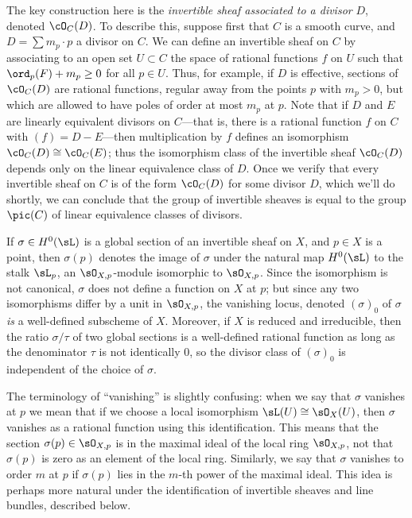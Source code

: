 The key construction here is the \emph{invertible sheaf associated to a divisor} $D$, denoted $\cO_C(D)$. To describe this, suppose first that $C$ is a smooth curve, and $D = \sum m_p\cdot p$ a divisor on $C$. We can define an invertible sheaf on $C$ by associating to an open set $U \subset C$ the space of rational functions $f$ on $U$ such that $\ord_p(F) + m_p \geq 0$ for all $p \in U$. Thus, for example, if $D$ is effective, sections of $\cO_C(D)$ are rational functions, regular away from the points $p$ with $m_p > 0$, but which are allowed to have poles of order at most $m_p$ at $p$. Note that if $D$ and $E$ are linearly equivalent divisors on $C$---that is, there is a rational function $f$ on $C$ with $(f) = D - E$---then multiplication by $f$ defines an isomorphism $\cO_C(D) \cong \cO_C(E)$; thus the isomorphism class of the invertible sheaf $\cO_C(D)$ depends only on the linear equivalence class of $D$. Once we verify that every invertible sheaf on $C$ is of the form $\cO_C(D)$ for some divisor $D$, which we'll do shortly, we can conclude that the group of invertible sheaves is equal to the group $\pic(C)$ of linear equivalence classes of divisors. 

If $\sigma \in H^0(\sL)$ is a global section of an invertible sheaf
on $X$, and $p\in X$ is a point, then $\sigma(p)$ denotes the image of $\sigma$ under the natural map $H^0(\sL)$ to the stalk $\sL_{p}$, an $\sO_{X,p}$-module isomorphic to $\sO_{X,p}$. Since the isomorphism is not canonical, $\sigma$ does not define a function on $X$ at $p$; but since any two isomorphisms
differ by a unit in $\sO_{X,p}$, the vanishing locus, denoted $(\sigma)_0$ of $\sigma$ \emph{is} a well-defined subscheme of $X$. Moreover, if $X$ is reduced and irreducible, then the ratio $\sigma/\tau$ of two global sections is a well-defined rational function as long as the denominator $\tau$ is not identically 0, so the divisor class of 
$(\sigma)_0$ is independent of the choice of $\sigma$.

The terminology of ``vanishing'' is slightly confusing: when we  say that $\sigma$ vanishes at $p$ we mean
that if we choose a local isomorphism $\sL(U) \cong \sO_X(U)$, then $\sigma$ vanishes as a rational function using this
identification. This means that the section $\sigma(p)\in \sO_{X,p}$ is in the maximal ideal of the local ring $ \sO_{X,p}$, not that $\sigma(p)$ is zero
as an element of the local ring. Similarly, we say that $\sigma$ vanishes to order $m$ at $p$ if $\sigma(p)$ lies in the
$m$-th power of the maximal ideal. This idea is perhaps more natural under the identification of invertible sheaves and line bundles, described below.

